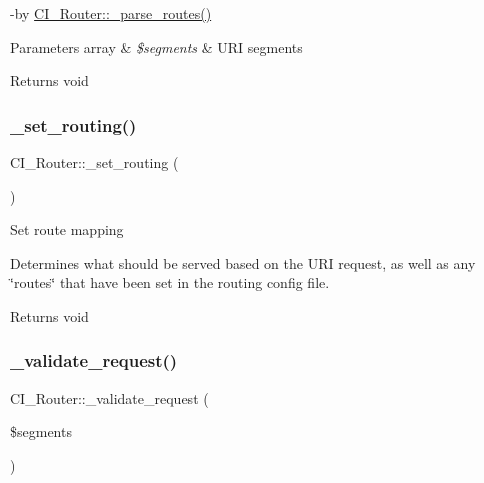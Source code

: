 -\/by \mbox{\hyperlink{class_c_i___router_a1b8a6b811df185009b34f3cf1c3a21e6}{C\+I\+\_\+\+Router\+::\+\_\+parse\+\_\+routes()}} 
\begin{DoxyParams}[1]{Parameters}
array & {\em \$segments} & U\+RI segments \\
\hline
\end{DoxyParams}
\begin{DoxyReturn}{Returns}
void 
\end{DoxyReturn}
\mbox{\label{class_c_i___router_aab7a56592f3121891fb6757fadc614e4}} 
\subsubsection{\texorpdfstring{\+\_\+set\+\_\+routing()}{\_set\_routing()}}
{\footnotesize\ttfamily C\+I\+\_\+\+Router\+::\+\_\+set\+\_\+routing (\begin{DoxyParamCaption}{ }\end{DoxyParamCaption})\hspace{0.3cm}{\ttfamily [protected]}}

Set route mapping

Determines what should be served based on the U\+RI request, as well as any \char`\"{}routes\char`\"{} that have been set in the routing config file.

\begin{DoxyReturn}{Returns}
void 
\end{DoxyReturn}
\mbox{\label{class_c_i___router_a8c534474aa24287176ff26879543ed87}} 
\subsubsection{\texorpdfstring{\+\_\+validate\+\_\+request()}{\_validate\_request()}}
{\footnotesize\ttfamily C\+I\+\_\+\+Router\+::\+\_\+validate\+\_\+request (\begin{DoxyParamCaption}\item[{}]{\$segments }\end{DoxyParamCaption})\hspace{0.3cm}{\ttfamily [protected]}}

